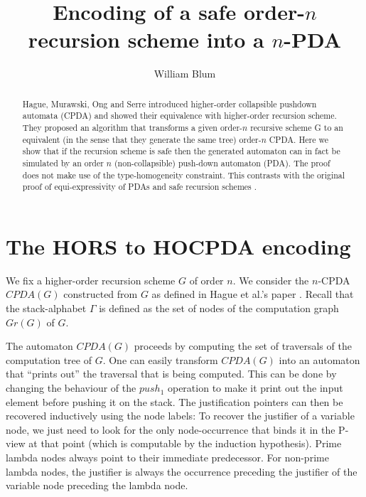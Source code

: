 \documentclass[a4paper]{article}
\author{William Blum}
\title{Encoding of a safe order-$n$ recursion scheme into a $n$-PDA}
\theoremstyle{remark}
\theoremstyle{definition}
\begin{document}
\maketitle
\begin{abstract}
Hague, Murawski, Ong and Serre \cite{hmos-lics08} introduced
higher-order collapsible pushdown automata (CPDA) and showed their
equivalence with higher-order recursion scheme. They proposed an
algorithm that transforms a given order-$n$ recursive scheme G to
an equivalent (in the sense that they generate the same tree) order-$n$ CPDA. Here we show that if the recursion
scheme is safe then the generated automaton can in fact be simulated by an order
$n$ (non-collapsible) push-down automaton (PDA). The proof does not make
use of the type-homogeneity constraint. This contrasts with the original proof
of equi-expressivity of PDAs and safe recursion schemes \cite{KNU02}.
\end{abstract}




\section{The HORS to HOCPDA encoding}

We fix a higher-order recursion scheme $G$ of order $n$.
We consider the $n$-CPDA $CPDA(G)$ constructed from $G$ as defined in Hague et al.'s paper \cite[Definition 5.2]{hague-collaps-full}.
Recall that the stack-alphabet $\Gamma$ is defined as the set of nodes of the computation graph $Gr(G)$ of $G$.

The automaton $CPDA(G)$ proceeds by computing the set of traversals of the computation tree of $G$. One can easily transform $CPDA(G)$ into an automaton that ``prints out'' the traversal that is being computed. This can be done by changing the behaviour of the $push_1$ operation to make it print out the input element before pushing it on the stack. The justification pointers can then be recovered inductively using the node labels: To recover the justifier of a variable node, we just need to look for the only node-occurrence that binds it in the P-view at that point (which is computable by the induction hypothesis).
Prime lambda nodes always point to their immediate predecessor. For non-prime lambda nodes, the justifier is always the occurrence preceding the justifier of the variable node preceding the lambda node.
\end{document}
